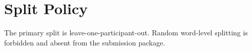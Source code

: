 \section{Split Policy}
The primary split is leave-one-participant-out. Random word-level splitting is forbidden and absent from the submission package.
